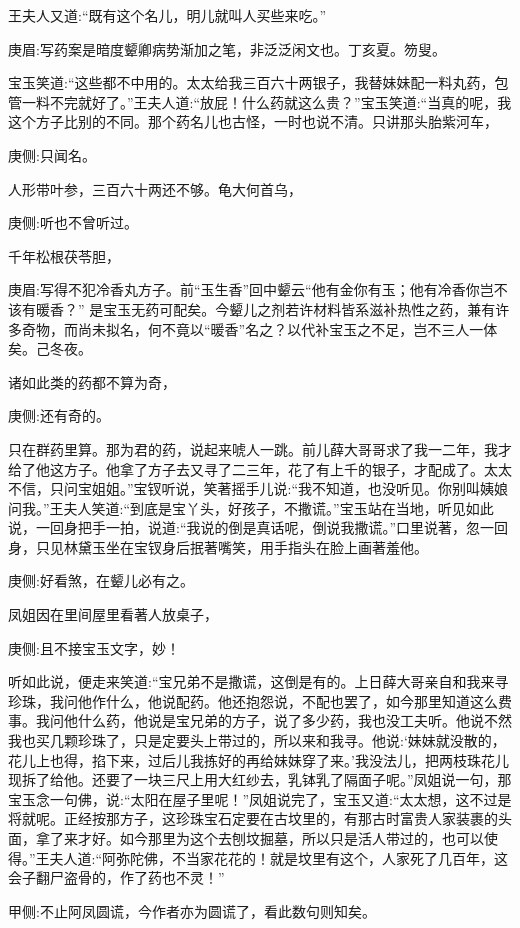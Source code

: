 \begin{parag}
    王夫人又道:“既有这个名儿，明儿就叫人买些来吃。”\begin{note}庚眉:写药案是暗度颦卿病势渐加之笔，非泛泛闲文也。丁亥夏。笏叟。\end{note}宝玉笑道:“这些都不中用的。太太给我三百六十两银子，我替妹妹配一料丸药，包管一料不完就好了。”王夫人道:“放屁！什么药就这么贵？”宝玉笑道:“当真的呢，我这个方子比别的不同。那个药名儿也古怪，一时也说不清。只讲那头胎紫河车，\begin{note}庚侧:只闻名。\end{note}人形带叶参，三百六十两还不够。龟大何首乌，\begin{note}庚侧:听也不曾听过。\end{note}千年松根茯苓胆，\begin{note}庚眉:写得不犯冷香丸方子。前“玉生香”回中颦云“他有金你有玉；他有冷香你岂不该有暖香？” 是宝玉无药可配矣。今颦儿之剂若许材料皆系滋补热性之药，兼有许多奇物，而尚未拟名，何不竟以“暖香”名之？以代补宝玉之不足，岂不三人一体矣。己冬夜。\end{note}诸如此类的药都不算为奇，\begin{note}庚侧:还有奇的。\end{note}只在群药里算。那为君的药，说起来唬人一跳。前儿薛大哥哥求了我一二年，我才给了他这方子。他拿了方子去又寻了二三年，花了有上千的银子，才配成了。太太不信，只问宝姐姐。”宝钗听说，笑著摇手儿说:“我不知道，也没听见。你别叫姨娘问我。”王夫人笑道:“到底是宝丫头，好孩子，不撒谎。”宝玉站在当地，听见如此说，一回身把手一拍，说道:“我说的倒是真话呢，倒说我撒谎。”口里说著，忽一回身，只见林黛玉坐在宝钗身后抿著嘴笑，用手指头在脸上画著羞他。\begin{note}庚侧:好看煞，在颦儿必有之。\end{note}
\end{parag}


\begin{parag}
    凤姐因在里间屋里看著人放桌子，\begin{note}庚侧:且不接宝玉文字，妙！\end{note}听如此说，便走来笑道:“宝兄弟不是撒谎，这倒是有的。上日薛大哥亲自和我来寻珍珠，我问他作什么，他说配药。他还抱怨说，不配也罢了，如今那里知道这么费事。我问他什么药，他说是宝兄弟的方子，说了多少药，我也没工夫听。他说不然我也买几颗珍珠了，只是定要头上带过的，所以来和我寻。他说:‘妹妹就没散的，花儿上也得，掐下来，过后儿我拣好的再给妹妹穿了来。’我没法儿，把两枝珠花儿现拆了给他。还要了一块三尺上用大红纱去，乳钵乳了隔面子呢。”凤姐说一句，那宝玉念一句佛，说:“太阳在屋子里呢！”凤姐说完了，宝玉又道:“太太想，这不过是将就呢。正经按那方子，这珍珠宝石定要在古坟里的，有那古时富贵人家装裹的头面，拿了来才好。如今那里为这个去刨坟掘墓，所以只是活人带过的，也可以使得。”王夫人道:“阿弥陀佛，不当家花花的！就是坟里有这个，人家死了几百年，这会子翻尸盗骨的，作了药也不灵！”\begin{note}甲侧:不止阿凤圆谎，今作者亦为圆谎了，看此数句则知矣。\end{note}
\end{parag}


